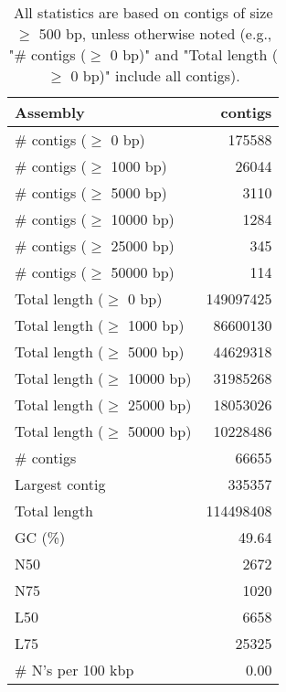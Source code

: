 \documentclass[12pt,a4paper]{article}
\begin{document}
\begin{table}[ht]
\begin{center}
\caption{All statistics are based on contigs of size $\geq$ 500 bp, unless otherwise noted (e.g., "\# contigs ($\geq$ 0 bp)" and "Total length ($\geq$ 0 bp)" include all contigs).}
\begin{tabular}{|l*{1}{|r}|}
\hline
Assembly & contigs \\ \hline
\# contigs ($\geq$ 0 bp) & 175588 \\ \hline
\# contigs ($\geq$ 1000 bp) & 26044 \\ \hline
\# contigs ($\geq$ 5000 bp) & 3110 \\ \hline
\# contigs ($\geq$ 10000 bp) & 1284 \\ \hline
\# contigs ($\geq$ 25000 bp) & 345 \\ \hline
\# contigs ($\geq$ 50000 bp) & 114 \\ \hline
Total length ($\geq$ 0 bp) & 149097425 \\ \hline
Total length ($\geq$ 1000 bp) & 86600130 \\ \hline
Total length ($\geq$ 5000 bp) & 44629318 \\ \hline
Total length ($\geq$ 10000 bp) & 31985268 \\ \hline
Total length ($\geq$ 25000 bp) & 18053026 \\ \hline
Total length ($\geq$ 50000 bp) & 10228486 \\ \hline
\# contigs & 66655 \\ \hline
Largest contig & 335357 \\ \hline
Total length & 114498408 \\ \hline
GC (\%) & 49.64 \\ \hline
N50 & 2672 \\ \hline
N75 & 1020 \\ \hline
L50 & 6658 \\ \hline
L75 & 25325 \\ \hline
\# N's per 100 kbp & 0.00 \\ \hline
\end{tabular}
\end{center}
\end{table}
\end{document}
